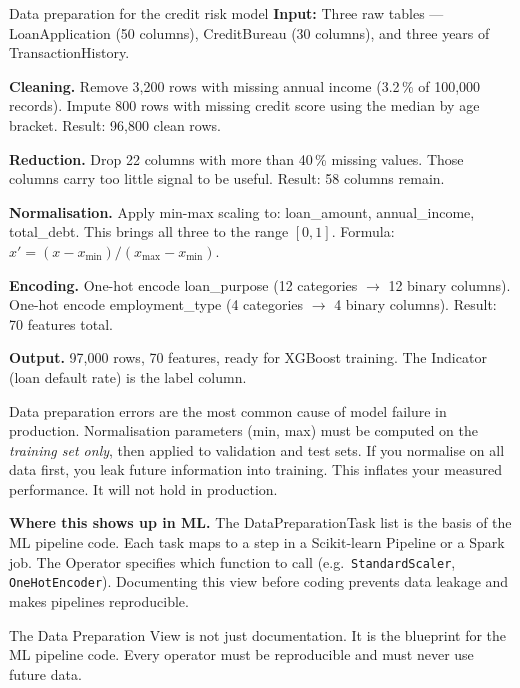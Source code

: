 \documentclass[a4paper,11pt]{article}
\begin{document}
\begin{worked}{Data preparation for the credit risk model}
\textbf{Input:} Three raw tables --- LoanApplication (50 columns), CreditBureau (30 columns),
and three years of TransactionHistory.
\begin{steps}
  \item \textbf{Cleaning.}
        Remove 3{,}200 rows with missing annual income (3.2\,\% of 100{,}000 records).
        Impute 800 rows with missing credit score using the median by age bracket.
        Result: 96{,}800 clean rows.
  \item \textbf{Reduction.}
        Drop 22 columns with more than 40\,\% missing values.
        Those columns carry too little signal to be useful.
        Result: 58 columns remain.
  \item \textbf{Normalisation.}
        Apply min-max scaling to: loan\_amount, annual\_income, total\_debt.
        This brings all three to the range $[0, 1]$.
        Formula: $x' = (x - x_{\min}) / (x_{\max} - x_{\min})$.
  \item \textbf{Encoding.}
        One-hot encode loan\_purpose (12 categories $\to$ 12 binary columns).
        One-hot encode employment\_type (4 categories $\to$ 4 binary columns).
        Result: 70 features total.
  \item \textbf{Output.}
        97{,}000 rows, 70 features, ready for XGBoost training.
        The Indicator (loan default rate) is the label column.
\end{steps}
\end{worked}

\begin{watchout}
Data preparation errors are the most common cause of model failure in production.
Normalisation parameters (min, max) must be computed on the \emph{training set only},
then applied to validation and test sets.
If you normalise on all data first, you leak future information into training.
This inflates your measured performance. It will not hold in production.
\end{watchout}

\noindent\textbf{Where this shows up in ML.}
The DataPreparationTask list is the basis of the ML pipeline code.
Each task maps to a step in a Scikit-learn Pipeline or a Spark job.
The Operator specifies which function to call (e.g.\
\texttt{StandardScaler}, \texttt{OneHotEncoder}).
Documenting this view before coding prevents data leakage and
makes pipelines reproducible.

\begin{keytake}
The Data Preparation View is not just documentation.
It is the blueprint for the ML pipeline code.
Every operator must be reproducible and must never use future data.
\end{keytake}
\end{document}

